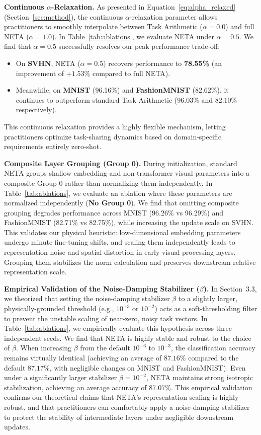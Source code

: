\textbf{Continuous $\alpha$-Relaxation.}
As presented in Equation~\ref{eq:alpha_relaxed} (Section~\ref{sec:method}), the continuous $\alpha$-relaxation parameter allows practitioners to smoothly interpolate between Task Arithmetic ($\alpha=0.0$) and full NETA ($\alpha=1.0$). 
In Table~\ref{tab:ablations}, we evaluate NETA under \textbf{$\alpha = 0.5$}. 
We find that $\alpha=0.5$ successfully resolves our peak performance trade-off:
\begin{itemize}
    \item On \textbf{SVHN}, NETA ($\alpha=0.5$) recovers performance to \textbf{78.55\%} (an improvement of \textbf{$+1.53\%$} compared to full NETA).
    \item Meanwhile, on \textbf{MNIST} (96.16\%) and \textbf{FashionMNIST} (82.62\%), it continues to outperform standard Task Arithmetic (96.03\% and 82.10\% respectively).
\end{itemize}
This continuous relaxation provides a highly flexible mechanism, letting practitioners optimize task-sharing dynamics based on domain-specific requirements entirely zero-shot.

\textbf{Composite Layer Grouping (Group 0).}
During initialization, standard NETA groups shallow embedding and non-transformer visual parameters into a composite Group 0 rather than normalizing them independently. 
In Table~\ref{tab:ablations}, we evaluate an ablation where these parameters are normalized independently (\textbf{No Group 0}). 
We find that omitting composite grouping degrades performance across MNIST (96.26\% vs 96.29\%) and FashionMNIST (82.71\% vs 82.75\%), while increasing the update scale on SVHN. This validates our physical heuristic: low-dimensional embedding parameters undergo minute fine-tuning shifts, and scaling them independently leads to representation noise and spatial distortion in early visual processing layers. Grouping them stabilizes the norm calculation and preserves downstream relative representation scale.

\textbf{Empirical Validation of the Noise-Damping Stabilizer ($\beta$).}
In Section~3.3, we theorized that setting the noise-damping stabilizer $\beta$ to a slightly larger, physically-grounded threshold (e.g., $10^{-3}$ or $10^{-2}$) acts as a soft-thresholding filter to prevent the unstable scaling of near-zero, noisy task vectors. In Table~\ref{tab:ablations}, we empirically evaluate this hypothesis across three independent seeds. 
We find that NETA is highly stable and robust to the choice of $\beta$. When increasing $\beta$ from the default $10^{-6}$ to $10^{-3}$, the classification accuracy remains virtually identical (achieving an average of $87.16\%$ compared to the default $87.17\%$, with negligible changes on MNIST and FashionMNIST). Even under a significantly larger stabilizer $\beta = 10^{-2}$, NETA maintains strong isotropic stabilization, achieving an average accuracy of $87.07\%$. This empirical validation confirms our theoretical claims that NETA's representation scaling is highly robust, and that practitioners can comfortably apply a noise-damping stabilizer to protect the stability of intermediate layers under negligible downstream updates.

